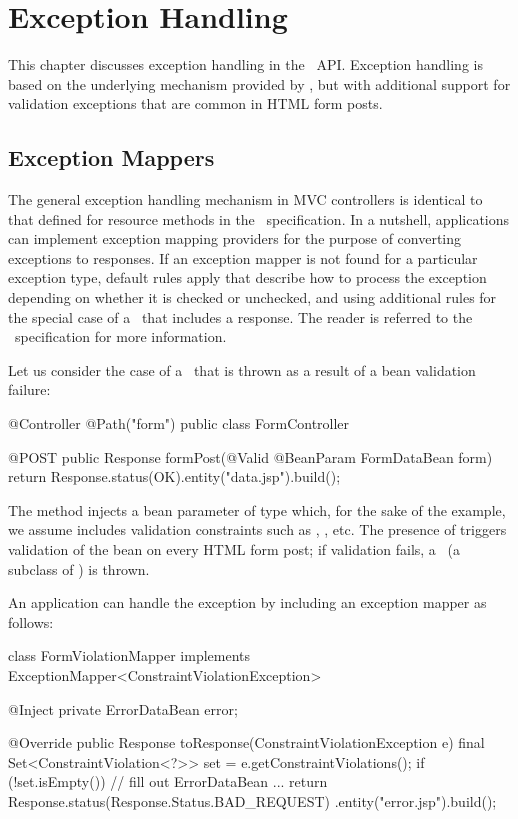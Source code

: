 \chapter{Exception Handling}
\label{exception_handling}

This chapter discusses exception handling in the \mvc\ API. Exception handling is based
on the underlying mechanism provided by \jaxrs, but with additional support for 
validation exceptions that are common in HTML form posts.

\section{Exception Mappers}
\label{exception_mappers}

The general exception handling mechanism in MVC controllers is identical to that defined
for resource methods in the \jaxrs\ specification. In a nutshell, applications can 
implement exception mapping providers for the purpose of converting exceptions to 
responses. If an exception mapper is not found for a particular exception type, 
default rules apply that describe how to process the exception depending on whether
it is checked or unchecked, and using additional rules for
the special case of a \WebAppExc\ that includes a response. The reader is referred
to the \jaxrs\ specification for more information.

Let us consider the case of a \ConstVioExc\ that is thrown as a result of a bean validation
failure:

\begin{listing}{1}
@Controller
@Path("form")
public class FormController {

    @POST
    public Response formPost(@Valid @BeanParam FormDataBean form) {
        return Response.status(OK).entity("data.jsp").build();    
    }
}
\end{listing}

The method  injects a bean parameter of type 
which, for the sake of the example, we assume includes validation constraints
such as , , etc. The presence of  triggers
validation of the bean on every HTML form post; if validation fails, a 
\ConstVioExc\ (a subclass of \ValExc) is thrown. 

An application can handle the exception by including an exception mapper as follows:

\begin{listing}{1}
class FormViolationMapper implements 
                          ExceptionMapper<ConstraintViolationException> {

    @Inject
    private ErrorDataBean error;

    @Override
    public Response toResponse(ConstraintViolationException e) {
        final Set<ConstraintViolation<?>> set = e.getConstraintViolations();
        if (!set.isEmpty()) {
            // fill out ErrorDataBean ...
        }
        return Response.status(Response.Status.BAD_REQUEST)
                       .entity("error.jsp").build();
    }
}
\end{listing}

